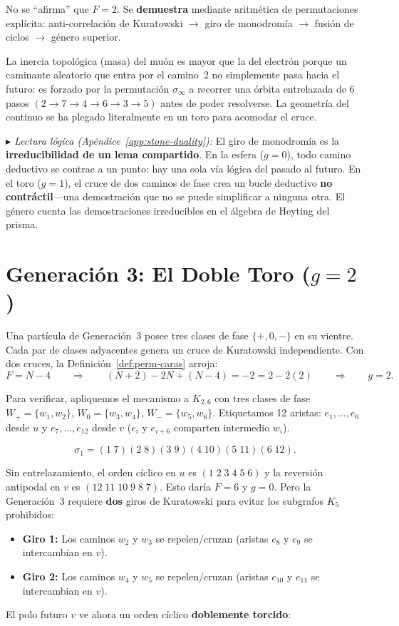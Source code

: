 \documentclass[11pt, a4paper, openany]{book}
\newcommand{\stoneref}[1]{%
  \smallskip\noindent
  {\small\color{structure!70}\textit{$\blacktriangleright$ Lectura
  l\'ogica (Ap\'endice~\ref{app:stone-duality}):} #1}%
  \smallskip}
\begin{document}
\begin{result}[title={La prueba rigurosa de la masa topológica}]
No se ``afirma'' que $F = 2$. Se \textbf{demuestra} mediante aritmética
de permutaciones explícita: anti-correlación de Kuratowski $\to$
giro de monodromía $\to$ fusión de ciclos $\to$ género superior.

La inercia topológica (masa) del muón es mayor que la del electrón
porque un caminante aleatorio que entra por el camino~2 no simplemente
pasa hacia el futuro: es forzado por la permutación $\sigma_\infty$ a
recorrer una órbita entrelazada de 6 pasos
$(2 \to 7 \to 4 \to 6 \to 3 \to 5)$ antes de poder resolverse. La
geometría del continuo se ha plegado literalmente en un toro para
acomodar el cruce.
\end{result}

\stoneref{El giro de monodromía es la \textbf{irreducibilidad de un
lema compartido}. En la esfera ($g = 0$), todo camino deductivo se
contrae a un punto: hay una sola vía lógica del pasado al futuro. En
el toro ($g = 1$), el cruce de dos caminos de fase crea un bucle
deductivo \textbf{no contráctil}---una demostración que no se puede
simplificar a ninguna otra. El género cuenta las demostraciones
irreducibles en el álgebra de Heyting del prisma.}

\section{Generación 3: El Doble Toro ($g = 2$)}
\label{sec:gen3-doble-toro}

Una partícula de Generación~3 posee tres clases de fase
$\{+, 0, -\}$ en su vientre. Cada par de clases adyacentes genera un
cruce de Kuratowski independiente. Con dos cruces, la
Definición~\ref{def:perm-caras} arroja:
\[
  F = N - 4 \qquad\Longrightarrow\qquad
  (N+2) - 2N + (N-4) = -2 = 2 - 2(2)
  \qquad\Longrightarrow\qquad g = 2.
\]

Para verificar, apliquemos el mecanismo a $K_{2,6}$ con tres clases de
fase $W_+ = \{w_1, w_2\}$, $W_0 = \{w_3, w_4\}$,
$W_- = \{w_5, w_6\}$. Etiquetamos 12 aristas: $e_1, \ldots, e_6$
desde $u$ y $e_7, \ldots, e_{12}$ desde $v$
($e_i$ y $e_{i+6}$ comparten intermedio $w_i$).

\[
  \sigma_1 = (1\;7)(2\;8)(3\;9)(4\;10)(5\;11)(6\;12).
\]

Sin entrelazamiento, el orden cíclico en $u$ es $(1\;2\;3\;4\;5\;6)$ y
la reversión antipodal en $v$ es $(12\;11\;10\;9\;8\;7)$. Esto daría
$F = 6$ y $g = 0$. Pero la Generación~3 requiere \textbf{dos} giros de
Kuratowski para evitar los subgrafos $K_5$ prohibidos:
\begin{itemize}
  \item \textbf{Giro 1:} Los caminos $w_2$ y $w_3$ se repelen/cruzan
        (aristas $e_8$ y $e_9$ se intercambian en $v$).
  \item \textbf{Giro 2:} Los caminos $w_4$ y $w_5$ se repelen/cruzan
        (aristas $e_{10}$ y $e_{11}$ se intercambian en $v$).
\end{itemize}
El polo futuro $v$ ve ahora un orden cíclico \textbf{doblemente torcido}:
\end{document}

